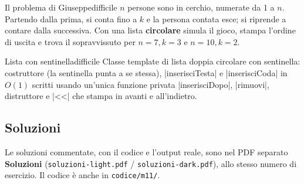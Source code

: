 \begin{esercizio}{Il problema di Giuseppe}{difficile}
$n$ persone sono in cerchio, numerate da 1 a $n$. Partendo dalla prima, si conta fino a
$k$ e la persona contata esce; si riprende a contare dalla successiva. Con una lista
\textbf{circolare} simula il gioco, stampa l'ordine di uscita e trova il sopravvissuto per
$n = 7, k = 3$ e $n = 10, k = 2$.
\end{esercizio}

\begin{esercizio}{Lista con sentinella}{difficile}
Classe template di lista doppia circolare con sentinella: costruttore (la sentinella
punta a se stessa), \cc|inserisciTesta| e \cc|inserisciCoda| in $O(1)$ scritti usando
un'unica funzione privata \cc|inserisciDopo|, \cc|rimuovi|, distruttore e \cc|<<| che
stampa in avanti e all'indietro.
\end{esercizio}

\subsection*{Soluzioni}
Le soluzioni commentate, con il codice e l'output reale, sono nel PDF separato
\textbf{Soluzioni} (\texttt{soluzioni-light.pdf} / \texttt{soluzioni-dark.pdf}),
allo stesso numero di esercizio. Il codice è anche in \texttt{codice/m11/}.
